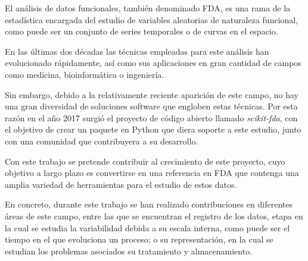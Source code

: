 El análisis de datos funcionales, también denominado FDA, es una rama de la 
estadística encargada del estudio de variables aleatorias de naturaleza
funcional, como puede ser un conjunto de series temporales o de curvas en el
espacio.

En las últimas dos décadas las técnicas empleadas para este análisis han
evolucionado rápidamente, así como sus aplicaciones en gran cantidad de campos
como medicina, bioinformática o ingeniería.

Sin embargo, debido a la relativamente reciente aparición de este campo, no hay
una gran diversidad de soluciones software que engloben estas técnicas. Por esta
razón en el año 2017 surgió el proyecto de código abierto 
llamado \textit{scikit-fda}, con el objetivo de crear un paquete en Python 
que diera soporte a este estudio, junto con una comunidad que contribuyera a su
desarrollo.

Con este trabajo se pretende contribuir al crecimiento de este proyecto, cuyo
objetivo a largo plazo es convertirse en una referencia en FDA que contenga una
amplia variedad de herramientas para el estudio de estos datos.

En concreto, durante este trabajo se han realizado contribuciones en diferentes
áreas de este campo, entre las que se encuentran el registro de los datos, etapa
en la cual se estudia la variabilidad debida a su escala interna, como puede
ser el tiempo en el que evoluciona un proceso; o su representación, en la cual
se estudian los problemas asociados su tratamiento y almacenamiento.
